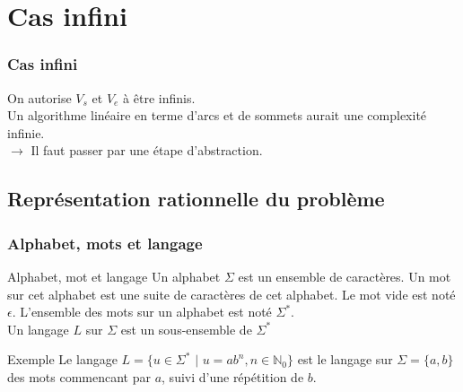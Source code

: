 \documentclass{beamer}
\begin{document}
\section{Cas infini}
\begin{frame}
\frametitle{Cas infini} %
On autorise $V_s$ et $V_e$ à être infinis.\\[3mm]

Un algorithme linéaire en terme d'arcs et de sommets aurait une complexité \alert{infinie}.\\[3mm]
$\rightarrow$ Il faut passer par une étape d'abstraction.
\end{frame}

\subsection{Représentation rationnelle du problème}
\begin{frame}
\frametitle{Alphabet, mots et langage}
\begin{block}{Alphabet, mot et langage}
Un alphabet $\Sigma$ est un ensemble de caractères. Un mot sur cet alphabet est une suite de caractères de cet alphabet. Le mot vide est noté $\epsilon$. L'ensemble des mots sur un alphabet est noté $\Sigma^*$.\\
Un langage $L$ sur $\Sigma$ est un sous-ensemble de $\Sigma^*$\\[3mm]
\end{block}
\begin{exampleblock}{Exemple}
Le langage $L=\{u\in\Sigma^*$ $|$ $u=ab^n, n\in\mathbb{N}_0\}$ est le langage sur $\Sigma=\{a,b\}$ des mots commencant par $a$, suivi d'une répétition de $b$.
\end{exampleblock}
\end{frame}
\end{document}
